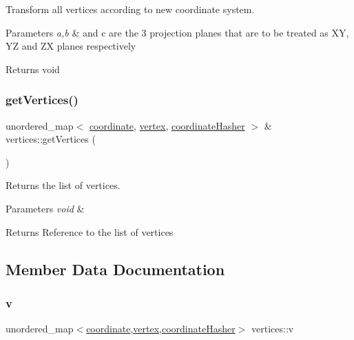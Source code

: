 Transform all vertices according to new coordinate system. 


\begin{DoxyParams}{Parameters}
{\em a,b} & and c are the 3 projection planes that are to be treated as XY, YZ and ZX planes respectively \\
\hline
\end{DoxyParams}
\begin{DoxyReturn}{Returns}
void 
\end{DoxyReturn}
\mbox{\label{classvertices_aee841be820213961900a8a7855b8b692}} 
\subsubsection{\texorpdfstring{get\+Vertices()}{getVertices()}}
{\footnotesize\ttfamily unordered\+\_\+map$<$ \mbox{\hyperlink{structcoordinate}{coordinate}}, \mbox{\hyperlink{objects_8h_a220193f61d87fe6929bf42d2bac515a7}{vertex}}, \mbox{\hyperlink{structcoordinate_hasher}{coordinate\+Hasher}} $>$ \& vertices\+::get\+Vertices (\begin{DoxyParamCaption}{ }\end{DoxyParamCaption})}



Returns the list of vertices. 


\begin{DoxyParams}{Parameters}
{\em void} & \\
\hline
\end{DoxyParams}
\begin{DoxyReturn}{Returns}
Reference to the list of vertices 
\end{DoxyReturn}


\subsection{Member Data Documentation}
\mbox{\label{classvertices_a0f41c20a63777890f588167e3158a2e5}} 
\subsubsection{\texorpdfstring{v}{v}}
{\footnotesize\ttfamily unordered\+\_\+map$<$\mbox{\hyperlink{structcoordinate}{coordinate}},\mbox{\hyperlink{objects_8h_a220193f61d87fe6929bf42d2bac515a7}{vertex}},\mbox{\hyperlink{structcoordinate_hasher}{coordinate\+Hasher}}$>$ vertices\+::v\hspace{0.3cm}{\ttfamily [private]}}



